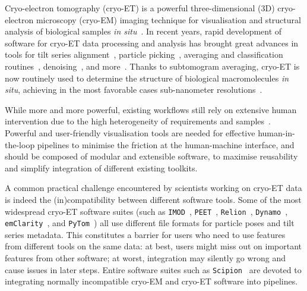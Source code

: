 Cryo-electron tomography (cryo-ET) is a powerful three-dimensional (3D) cryo-electron microscopy (cryo-EM) imaging technique for visualisation and structural analysis of biological samples \emph{in situ}~\cite{turkPromiseChallengesCryoelectron2020}. In recent years, rapid development of software for cryo-ET data processing and analysis has brought great advances in tools for tilt series alignment~\cite{zhengAreTomoIntegratedSoftware2022}, particle picking~\cite{riceTomoTwinGeneralized3D2023,wagnerSPHIREcrYOLOFastAccurate2019}, averaging and classification routines~\cite{zivanovBayesianApproachSingleparticle2022,tegunovRealtimeCryoelectronMicroscopy2019,tegunovMultiparticleCryoEMRefinement2021}, denoising~\cite{beplerTopazDenoiseGeneralDeep2020,buchholzCryoCAREContentAwareImage2019}, and more~\cite{galaz-montoyaSingleParticleTomography2015}. Thanks to subtomogram averaging, cryo-ET is now routinely used to determine the structure of biological macromolecules \emph{in situ}, achieving in the most favorable cases sub-nanometer resolutions~\cite{schurHighresolutionSituStructural2019,turonovaEfficient3DCTFCorrection2017}.

While more and more powerful, existing workflows still rely on extensive human intervention due to the high heterogeneity of requirements and samples~\cite{burtFlexibleFrameworkMultiparticle2021,scaramuzzaStepbystepGuideEfficient2021}. Powerful and user-friendly visualisation tools are needed for effective human-in-the-loop pipelines to minimise the friction at the human-machine interface, and should be composed of modular and extensible software, to maximise reusability and simplify integration of different existing toolkits.

A common practical challenge encountered by scientists working on cryo-ET data is indeed the (in)compatibility between different software tools. Some of the most widespread cryo-ET software suites (such as \texttt{IMOD}~\cite{kremerComputerVisualizationThreeDimensional1996}, \texttt{PEET}~\cite{nicastroMolecularArchitectureAxonemes2006,heumannClusteringVarianceMaps2011}, \texttt{Relion}~\cite{scheresRELIONImplementationBayesian2012}, \texttt{Dynamo}~\cite{castano-diezDynamoFlexibleUserfriendly2012}, \texttt{emClarity}~\cite{himesEmClaritySoftwareHighresolution2018}, and \texttt{PyTom}~\cite{hrabePyTomPythonbasedToolbox2012,chailletExtensiveAngularSampling2023}) all use different file formats for particle poses and tilt series metadata. This constitutes a barrier for users who need to use features from different tools on the same data: at best, users might miss out on important features from other software; at worst, integration may silently go wrong and cause issues in later steps. Entire software suites such as \texttt{Scipion}~\cite{delarosa-trevinScipionSoftwareFramework2016} are devoted to integrating normally incompatible cryo-EM and cryo-ET software into pipelines.

